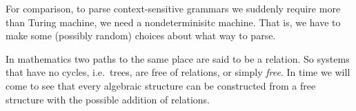 For comparison, to parse context-sensitive grammars we suddenly require more 
than Turing machine, we need a nondeterminisitc machine.  That is, we have to make 
some (possibly random) choices about what way to parse.





    

In mathematics two paths to the same place are said to be a relation.  So systems that have no cycles, i.e.\ trees, are 
free of relations, or simply \emph{free}.  In time we will come to see 
that every algebraic structure can be constructed from a free 
structure with the possible addition of relations.


